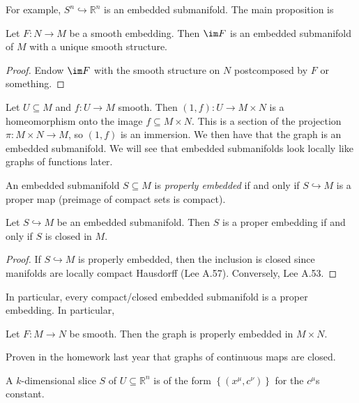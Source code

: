 
For example, $S^n\hookrightarrow \mathbb{R} ^n$ is an embedded submanifold. The main proposition is
\begin{proposition}\label{2.1.2}
	Let $F : N \to M$ be a smooth embedding. Then $\im F$ is an embedded submanifold of $M$ with a unique smooth structure.
\end{proposition}
\begin{proof}
	Endow $\im F$ with the smooth structure on $N$ postcomposed by $F$ or something.
\end{proof}

Let $U\subseteq M$ and $f : U \to M$ smooth. Then $(1,f): U \to M\times N$ is a homeomorphism onto the image $f\subseteq M\times N$. This is a section of the projection $\pi : M\times N \to M$, so $(1,f)$ is an immersion. We then have that the graph is an embedded submanifold. We will see that embedded submanifolds look locally like graphs of functions later.

\begin{definition}\label{2.1.3}
	An embedded submanifold $S\subseteq M$ is \emph{properly embedded} if and only if $S\hookrightarrow M$ is a proper map (preimage of compact sets is compact).
\end{definition}

\begin{proposition}\label{2.1.4}
	Let $S\hookrightarrow M$ be an embedded submanifold. Then $S$ is a proper embedding if and only if $S$ is closed in $M$.
\end{proposition}
\begin{proof}
	If $S\hookrightarrow M$ is properly embedded, then the inclusion is closed since manifolds are locally compact Hausdorff (Lee A.57). Conversely, Lee A.53.
\end{proof}

In particular, every compact/closed embedded submanifold is a proper embedding. In particular,

\begin{proposition}\label{2.1.5}
	Let $F : M \to N$ be smooth. Then the graph is properly embedded in $M\times N$.
\end{proposition}
Proven in the homework last year that graphs of continuous maps are closed.

\begin{definition}\label{2.1.6}
	A $k$-dimensional slice $S$ of $U\subseteq \mathbb{R} ^n$ is of the form $\left\{ (x^\mu ,c^\nu ) \right\} $ for the $c^\mu $s constant.
\end{definition}

